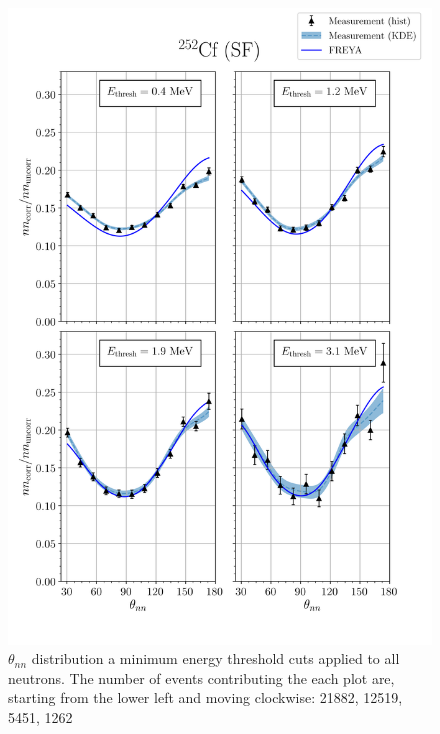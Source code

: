 \begin{figure}
\centering
    \includegraphics[width = 1.1\textwidth]{Content/Results/FinalCf252Resultw_freya0KDE.png}
    \caption{
    $\theta_{nn}$ distribution a minimum energy threshold cuts applied to all neutrons.
    The number of events contributing the each plot are, starting from the lower left and moving clockwise: 21882, 12519, 5451, 1262}
    \label{fig:Cf(0)}
\end{figure}

